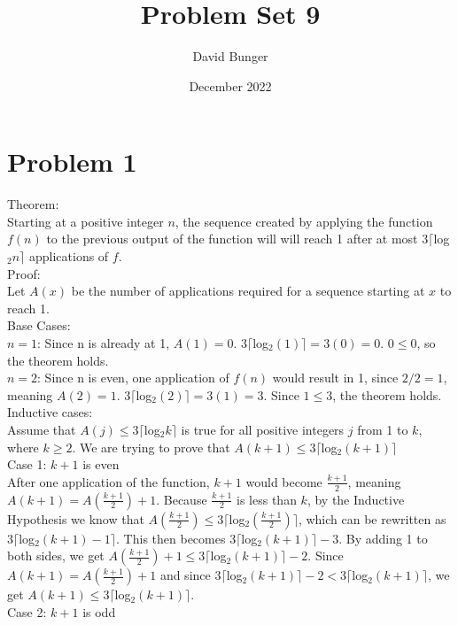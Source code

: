 \documentclass{article}
\title{Problem Set 9}
\author{David Bunger}
\date{December 2022}
\begin{document}
\maketitle

\section*{Problem 1}
Theorem:\\
Starting at a positive integer $n$, the sequence created by applying the function $f(n)$ to the previous output of the function will will reach 1 after at most $3\lceil $log$_2n\rceil$ applications of $f$.\\
\newline
Proof:\\
Let $A(x)$ be the number of applications required for a sequence starting at $x$ to reach 1.\\
\newline
Base Cases:\\
$n=1$: Since n is already at 1, $A(1)=0$. $3\lceil $log$_2(1)\rceil=3(0)=0$. $0\leq 0$, so the theorem holds.\\
$n=2$: Since n is even, one application of $f(n)$ would result in 1, since $2/2=1$, meaning $A(2)=1$. $3\lceil $log$_2(2)\rceil=3(1)=3$. Since $1\leq 3$, the theorem holds.\\
\newline
Inductive cases:\\
Assume that $A(j)\leq 3\lceil $log$_2k\rceil$ is true for all positive integers $j$ from 1 to $k$, where $k\geq 2$. We are trying to prove that $A(k+1)\leq3\lceil $log$_2(k+1)\rceil$\\
\newline
Case 1: $k+1$ is even\\
After one application of the function, $k+1$ would become $\frac{k+1}{2}$, meaning \\$A(k+1)=A(\frac{k+1}{2})+1$. Because $\frac{k+1}{2}$ is less than $k$, by the Inductive Hypothesis we know that $A(\frac{k+1}{2})\leq3\lceil $log$_2(\frac{k+1}{2})\rceil$, which can be rewritten as $3\lceil $log$_2(k+1)-1\rceil$. This then becomes $3\lceil $log$_2(k+1)\rceil -3$. By adding 1 to both sides, we get $A(\frac{k+1}{2})+1\leq 3\lceil $log$_2(k+1)\rceil -2$. Since $A(k+1)=A(\frac{k+1}{2})+1$ and since $3\lceil $log$_2(k+1)\rceil -2 < 3\lceil $log$_2(k+1)\rceil$, we get $A(k+1)\leq3\lceil $log$_2(k+1)\rceil$.\\
\clearpage
Case 2: $k+1$ is odd\\
\end{document}
